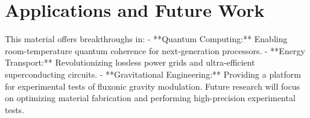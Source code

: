 \documentclass{article}
\begin{document}
\section{Applications and Future Work}
This material offers breakthroughs in:
- **Quantum Computing:** Enabling room-temperature quantum coherence for next-generation processors.
- **Energy Transport:** Revolutionizing lossless power grids and ultra-efficient superconducting circuits.
- **Gravitational Engineering:** Providing a platform for experimental tests of fluxonic gravity modulation.
Future research will focus on optimizing material fabrication and performing high-precision experimental tests.
\end{document}
